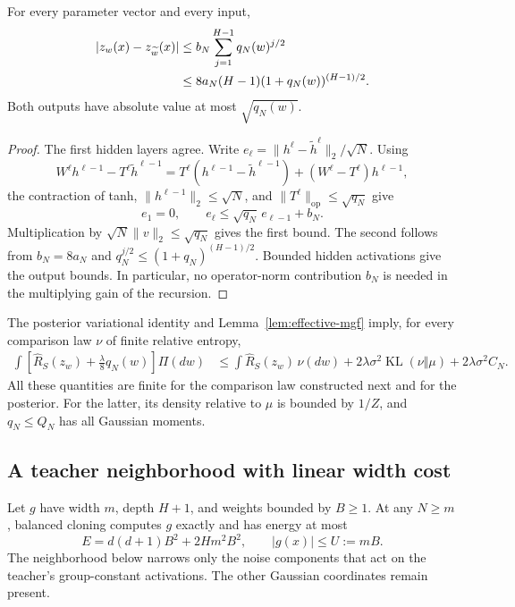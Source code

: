 \begin{lemma}
\label{lem:effective-approximation}
For every parameter vector and every input,
\begin{align}
 |z_w(x)-z_{\widetilde w}(x)|
 &\leq b_N\sum_{j=1}^{H-1}q_N(w)^{j/2}
 \notag\\
 &\leq8a_N(H-1)(1+q_N(w))^{(H-1)/2}.
 \label{eq:effective-approximation}
\end{align}
Both outputs have absolute value at most $\sqrt{q_N(w)}$.
\end{lemma}
\begin{proof}
The first hidden layers agree.  Write
$e_\ell=\|h^\ell-\widetilde h^\ell\|_2/\sqrt N$.
Using
\[
 W^\ell h^{\ell-1}-T^\ell\widetilde h^{\ell-1}
 =T^\ell(h^{\ell-1}-\widetilde h^{\ell-1})
      +(W^\ell-T^\ell)h^{\ell-1},
\]
the contraction of tanh, $\|h^{\ell-1}\|_2\leq\sqrt N$, and
$\|T^\ell\|_{\mathrm{op}}\leq\sqrt{q_N}$ give
\[
 e_1=0,\qquad e_\ell\leq\sqrt{q_N}\,e_{\ell-1}+b_N.
\]
Multiplication by $\sqrt N\|v\|_2\leq\sqrt{q_N}$ gives the first
bound.  The second follows from $b_N=8a_N$ and
$q_N^{j/2}\leq(1+q_N)^{(H-1)/2}$.  Bounded hidden activations give
the output bounds.  In particular, no operator-norm contribution
$b_N$ is needed in the multiplying gain of the recursion.
\end{proof}

The posterior variational identity and
Lemma~\ref{lem:effective-mgf} imply, for every comparison law $\nu$
of finite relative entropy,
\begin{align}
 \int\left[\widehat R_S(z_w)+\frac\lambda8q_N(w)\right]\Pi(dw)
 &\leq\int\widehat R_S(z_w)\,\nu(dw)
       +2\lambda\sigma^2\operatorname{KL}(\nu\Vert\mu)
       +2\lambda\sigma^2 C_N.
 \label{eq:effective-variational}
\end{align}
All these quantities are finite for the comparison law constructed
next and for the posterior.  For the latter, its density relative to
$\mu$ is bounded by $1/Z$, and $q_N\leq Q_N$ has all Gaussian moments.

\subsection{A teacher neighborhood with linear width cost}

Let $g$ have width $m$, depth $H+1$, and weights bounded by $B\geq1$.
At any $N\geq m$, balanced cloning computes $g$ exactly and has energy
at most
\begin{equation}
 E=d(d+1)B^2+2Hm^2B^2,
 \qquad |g(x)|\leq U:=mB.
 \label{eq:effective-teacher-energy}
\end{equation}
The neighborhood below narrows only the noise components that act on
the teacher's group-constant activations.  The other Gaussian
coordinates remain present.

